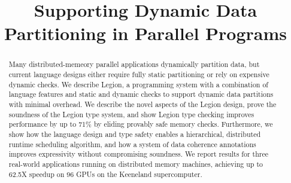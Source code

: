\documentclass[9pt,nocopyrightspace,preprint]{sigplanconf}
\begin{document}
\title{Supporting Dynamic Data Partitioning in Parallel Programs}
\maketitle

\begin{abstract}
Many distributed-memeory parallel applications dynamically partition 
data, but current language designs either 
require fully static partitioning or rely on expensive dynamic checks.
We describe Legion, a programming system with a combination
of language features and static and dynamic checks to support 
dynamic data partitions with minimal overhead.
We describe the novel aspects of the Legion design, prove the soundness of the Legion type system,
 and show Legion type checking improves performance by up to 71\% by eliding provably
safe memory checks.  Furthermore, we show how the language design and type safety
enables a hierarchical, distributed runtime scheduling algorithm, and how
a system of data coherence annotations improves expressivity without compromising
soundness. We report results for three real-world applications running
on distributed memory machines, achieving up to 62.5X speedup on 96 GPUs 
on the Keeneland supercomputer.



\end{abstract}
\end{document}
